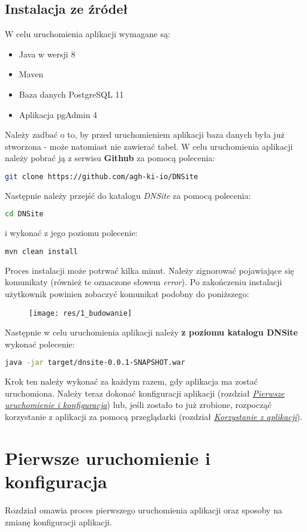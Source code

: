 \documentclass[12pt] {article}
\begin{document}
\subsection{Instalacja ze źródeł}
W celu uruchomienia aplikacji wymagane są:
\begin{itemize}
\item Java w wersji 8
\item Maven
\item Baza danych PostgreSQL 11
\item Aplikacja pgAdmin 4
\end{itemize}
Należy zadbać o to, by przed uruchomieniem aplikacji baza danych była już stworzona - może natomiast nie zawierać tabel.
W celu uruchomienia aplikacji należy pobrać ją z serwisu \textbf{Github} za pomocą polecenia:
\begin{lstlisting}[language=bash]
git clone https://github.com/agh-ki-io/DNSite
\end{lstlisting}
Następnie należy przejść do katalogu \emph{DNSite} za pomocą polecenia:
\begin{lstlisting}[language=bash]
cd DNSite
\end{lstlisting}
i wykonać z jego poziomu polecenie:
\begin{lstlisting}[language=bash]
mvn clean install
\end{lstlisting}
Proces instalacji może potrwać kilka minut. Należy zignorować pojawiające się komunikaty (również te oznaczone słowem \emph{error}). Po zakończeniu instalacji użytkownik powinien zobaczyć komunikat podobny do poniższego:
\begin{figure}[H]
\centering
\texttt{[image: res/1\_budowanie]}
\end{figure}
Następnie w celu uruchomienia aplikacji należy \textbf{z poziomu katalogu DNSite} wykonać polecenie:
\begin{lstlisting}[language=bash]
java -jar target/dnsite-0.0.1-SNAPSHOT.war
\end{lstlisting}
Krok ten należy wykonać za każdym razem, gdy aplikacja ma zostać uruchomiona. Należy teraz dokonać konfiguracji aplikacji (rozdział \hyperref[first_run]{\emph{Pierwsze uruchomienie i konfiguracja}}) lub, jeśli zostało to już zrobione, rozpocząć korzystanie z aplikacji za pomocą przeglądarki (rozdział \hyperref[webapp]{\emph{Korzystanie z aplikacji}}).

\section{Pierwsze uruchomienie i konfiguracja}
\label{first_run}
Rozdział omawia proces pierwszego uruchomienia aplikacji oraz sposoby na zmianę konfiguracji aplikacji.
\end{document}
